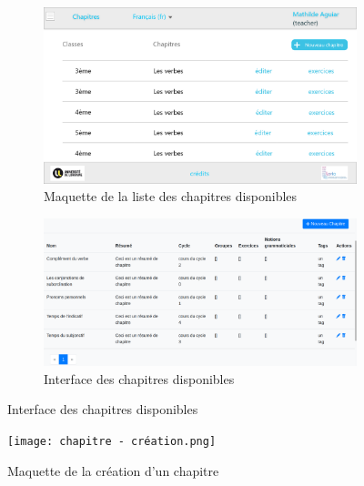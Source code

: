 \documentclass[12pt]{article}
\begin{document}
\begin{figure}
    \begin{subfigure}
        \centering
        \includegraphics[scale=0.27]{Chapitres.png}
        \caption{Maquette de la liste des chapitres disponibles}
        \label{fig:maquette1}
    \end{subfigure}
    
    \begin{subfigure}
         \centering
        \includegraphics[scale=0.28]{table_chap.png}
        \caption{Interface des chapitres disponibles}
        \label{fig:table_chap}
    \end{subfigure}
    
    
\end{figure}



\begin{figure}
        \centering
        \texttt{[image: chapitre - création.png]}
        \caption{Maquette de la création d'un chapitre}
        \label{fig:mquette2}
\end{figure}
\end{document}
